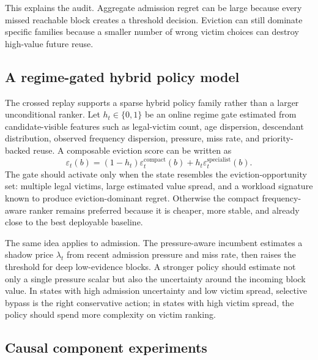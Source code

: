 \documentclass[11pt]{article}
\begin{document}
This explains the audit.  Aggregate admission regret can be large because every missed
reachable block creates a threshold decision.  Eviction can still dominate specific
families because a smaller number of wrong victim choices can destroy high-value
future reuse.

\subsection{A regime-gated hybrid policy model}

The crossed replay supports a sparse hybrid policy family rather than a larger
unconditional ranker.  Let \(h_t\in\{0,1\}\) be an online regime gate estimated from
candidate-visible
features such as legal-victim count, age dispersion, descendant distribution, observed
frequency dispersion, pressure, miss rate, and priority-backed reuse.  A composable
eviction score can be written as
\begin{equation}
  \varepsilon_t(b)=
  (1-h_t)\varepsilon^{\mathrm{compact}}_t(b)
  +h_t\varepsilon^{\mathrm{specialist}}_t(b).
  \label{eq:regime-gated-eviction}
\end{equation}
The gate should activate only when the state resembles the eviction-opportunity set:
multiple legal victims, large estimated value spread, and a workload signature known to
produce eviction-dominant regret.  Otherwise the compact frequency-aware ranker remains
preferred because it is cheaper, more stable, and already close to the best deployable
baseline.

The same idea applies to admission.  The pressure-aware incumbent estimates a shadow
price \(\lambda_t\) from recent admission pressure and miss rate, then raises the
threshold for deep low-evidence blocks.  A stronger policy should estimate not only a
single pressure scalar but also the uncertainty around the incoming block value.  In
states with high admission uncertainty and low victim spread, selective bypass is the
right conservative action; in states with high victim spread, the policy should spend
more complexity on victim ranking.

\subsection{Causal component experiments}
\end{document}
